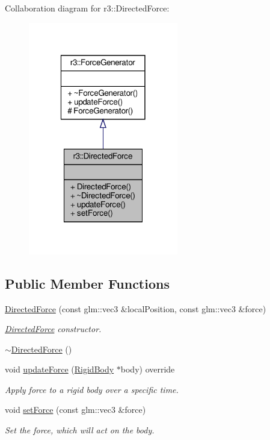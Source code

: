 Collaboration diagram for r3\+:\+:Directed\+Force\+:\nopagebreak
\begin{figure}[H]
\begin{center}
\leavevmode
\includegraphics[width=185pt]{classr3_1_1_directed_force__coll__graph}
\end{center}
\end{figure}
\subsection*{Public Member Functions}
\begin{DoxyCompactItemize}
\item 
\mbox{\hyperlink{classr3_1_1_directed_force_a01b61a6ebe0c54f92952d69e3d0cf09e}{Directed\+Force}} (const glm\+::vec3 \&local\+Position, const glm\+::vec3 \&force)
\begin{DoxyCompactList}\small\item\em \mbox{\hyperlink{classr3_1_1_directed_force}{Directed\+Force}} constructor. \end{DoxyCompactList}\item 
\mbox{\hyperlink{classr3_1_1_directed_force_a98aa1b750a187ba18a6fce0c530e397f}{$\sim$\+Directed\+Force}} ()
\item 
void \mbox{\hyperlink{classr3_1_1_directed_force_a13dc064fe26dabe6c2803f027079e26b}{update\+Force}} (\mbox{\hyperlink{classr3_1_1_rigid_body}{Rigid\+Body}} $\ast$body) override
\begin{DoxyCompactList}\small\item\em Apply force to a rigid body over a specific time. \end{DoxyCompactList}\item 
void \mbox{\hyperlink{classr3_1_1_directed_force_a5c25cdaa94e053ffd2614472d2a04c7e}{set\+Force}} (const glm\+::vec3 \&force)
\begin{DoxyCompactList}\small\item\em Set the force, which will act on the body. \end{DoxyCompactList}\end{DoxyCompactItemize}

